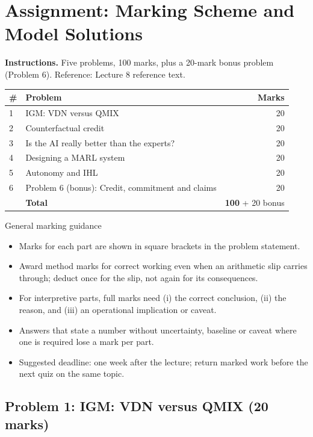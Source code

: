 \documentclass[11pt]{article}
\begin{document}
\section{Assignment: Marking Scheme and Model Solutions}

\textbf{Instructions.} Five problems, 100 marks, plus a 20-mark bonus problem (Problem 6). Reference: Lecture 8 reference text.

\begin{center}\small\renewcommand{\arraystretch}{1.25}\begin{tabularx}{0.85\textwidth}{@{}l X r@{}}\toprule\textbf{\#} & \textbf{Problem} & \textbf{Marks}\\\midrule1 & IGM: VDN versus QMIX & 20\\
2 & Counterfactual credit & 20\\
3 & Is the AI really better than the experts? & 20\\
4 & Designing a MARL system & 20\\
5 & Autonomy and IHL & 20\\
6 & Problem 6 (bonus): Credit, commitment and claims & 20\\\midrule & \textbf{Total} & \textbf{100} + 20 bonus\\\bottomrule\end{tabularx}\end{center}

\begin{instr}{General marking guidance}\begin{itemize}
\item Marks for each part are shown in square brackets in the problem statement.
\item Award method marks for correct working even when an arithmetic slip carries through; deduct once for the slip, not again for its consequences.
\item For interpretive parts, full marks need (i) the correct conclusion, (ii) the reason, and (iii) an operational implication or caveat.
\item Answers that state a number without uncertainty, baseline or caveat where one is required lose a mark per part.
\item Suggested deadline: one week after the lecture; return marked work before the next quiz on the same topic.
\end{itemize}\end{instr}

\subsection{Problem 1: IGM: VDN versus QMIX \normalfont\small\color{GreyN}(20 marks)}
\end{document}
